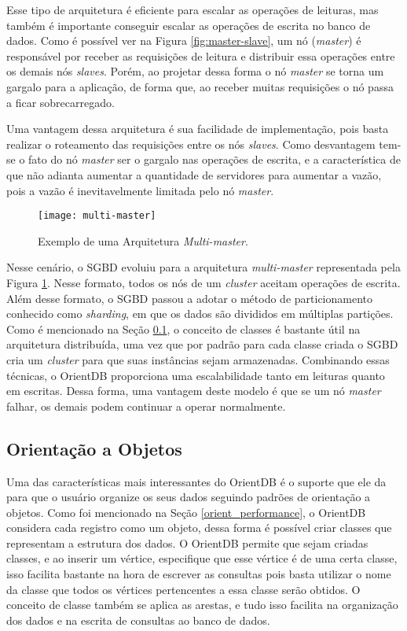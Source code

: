 	Esse tipo de arquitetura é eficiente para escalar as operações de leituras, mas também é importante conseguir escalar as operações de escrita no banco de dados. Como é possível ver na Figura \ref{fig:master-slave}, um nó (\textit{master}) é responsável por receber as requisições de leitura e distribuir essa operações entre os demais nós \textit{slaves}. Porém, ao projetar dessa forma o nó \textit{master} se torna um gargalo para a aplicação, de forma que, ao receber muitas requisições o nó passa a ficar sobrecarregado.
	
	Uma vantagem dessa arquitetura é sua facilidade de implementação, pois basta realizar o roteamento das requisições entre os nós \textit{slaves}. Como desvantagem tem-se o fato do nó \textit{master} ser o gargalo nas operações de escrita, e a característica de que não adianta aumentar a quantidade de servidores para aumentar a vazão, pois a vazão é inevitavelmente limitada pelo nó \textit{master}.
	
\begin{figure}[h]
	\centering
    \texttt{[image: multi-master]}
    \caption{Exemplo de uma Arquitetura \textit{Multi-master}.}
    \label{fig:multi-master}
\end{figure}
	
	Nesse cenário, o SGBD evoluiu para a arquitetura \textit{multi-master} representada pela Figura \ref{fig:multi-master}. Nesse formato, todos os nós de um \textit{cluster} aceitam operações de escrita. Além desse formato, o SGBD passou a adotar o método de particionamento conhecido como \textit{sharding}, em que os dados são divididos em múltiplas partições. Como é mencionado na Seção \ref{orient_object}, o conceito de classes é bastante útil na arquitetura distribuída, uma vez que por padrão para cada classe criada o SGBD cria um \textit{cluster} para que suas instâncias sejam armazenadas. Combinando essas técnicas, o OrientDB proporciona uma escalabilidade tanto em leituras quanto em escritas. Dessa forma, uma vantagem deste modelo é que se um nó \textit{master} falhar, os demais podem continuar a operar normalmente.

\subsection{Orientação a Objetos} \label{orient_object}

	Uma das características mais interessantes do OrientDB é o suporte que ele da para que o usuário organize os seus dados seguindo padrões de orientação a objetos. Como foi mencionado na Seção \ref{orient_performance}, o OrientDB considera cada registro como um objeto, dessa forma é possível criar classes que representam a estrutura dos dados. O OrientDB permite que sejam criadas classes, e ao inserir um vértice, especifique que esse vértice é de uma certa classe, isso facilita bastante na hora de escrever as consultas pois basta utilizar o nome da classe que todos os vértices pertencentes a essa classe serão obtidos. O conceito de classe também se aplica as arestas, e tudo isso facilita na organização dos dados e na escrita de consultas ao banco de dados.
	
